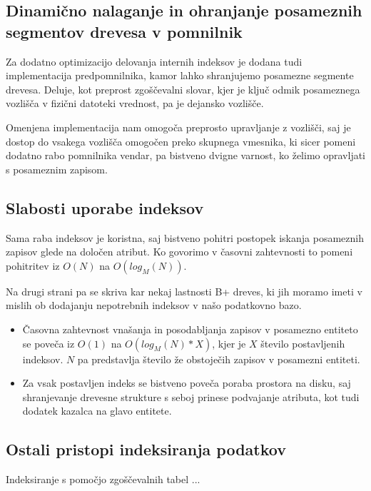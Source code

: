 \documentclass[a4paper,12pt,openright]{book}
\begin{document}
        \subsection{Dinamično nalaganje in ohranjanje posameznih segmentov drevesa v pomnilnik}
        Za dodatno optimizacijo delovanja internih indeksov je dodana tudi implementacija predpomnilnika, kamor lahko shranjujemo posamezne segmente drevesa. Deluje, kot preprost zgoščevalni slovar, kjer je ključ odmik posameznega vozlišča v fizični datoteki vrednost, pa je dejansko vozlišče.

        Omenjena implementacija nam omogoča preprosto upravljanje z vozlišči, saj je dostop do vsakega vozlišča omogočen preko skupnega vmesnika, ki sicer pomeni dodatno rabo pomnilnika vendar, pa bistveno dvigne varnost, ko želimo opravljati s posameznim zapisom.
        
        \subsection{Slabosti uporabe indeksov}

        Sama raba indeksov je koristna, saj bistveno pohitri postopek iskanja posameznih zapisov glede na določen atribut. Ko govorimo v časovni zahtevnosti to pomeni pohitritev iz $O(N)$ na $O(log_M(N))$.

        Na drugi strani pa se skriva kar nekaj lastnosti B+ dreves, ki jih moramo imeti v mislih ob dodajanju nepotrebnih indeksov v našo podatkovno bazo.
        \begin{itemize}
            \item Časovna zahtevnost vnašanja in posodabljanja zapisov v posamezno entiteto se poveča iz $O(1)$ na $O(log_M(N) * X)$, kjer je $X$ število postavljenih indeksov. $N$ pa predstavlja število že obstoječih zapisov v posamezni entiteti.
            \item Za vsak postavljen indeks se bistveno poveča poraba prostora na disku, saj shranjevanje drevesne strukture s seboj prinese podvajanje atributa, kot tudi dodatek kazalca na glavo entitete.
        \end{itemize}

        \subsection{Ostali pristopi indeksiranja podatkov}
        \colorbox{BurntOrange}{Indeksiranje s pomočjo zgoščevalnih tabel ...}
        
\end{document}
